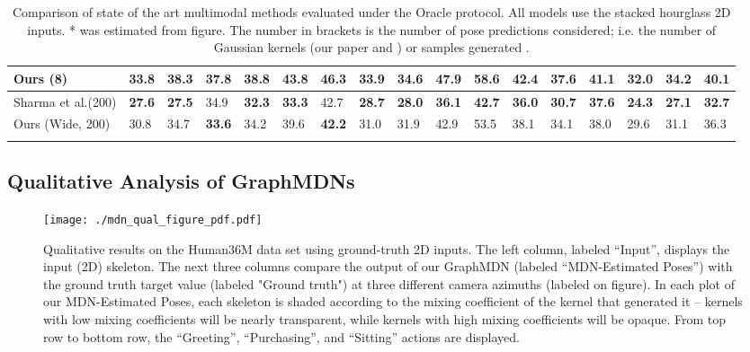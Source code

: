 \begin{table}
\begin{tabular}{lllllllllllllllll}
Ours (8) & 33.8 & 38.3 & 37.8 & 38.8 & 43.8 & 46.3 & 33.9 & 34.6 & 47.9 & 58.6 & 42.4 & 37.6 & 41.1 & 32.0 & 34.2 & 40.1 \\ \hline
Sharma et al.\cite{Sharma_2019_ICCV}(200) & \textbf{27.6} & \textbf{27.5} & 34.9 & \textbf{32.3} & \textbf{33.3} & 42.7 & \textbf{28.7} & \textbf{28.0} & \textbf{36.1} & \textbf{42.7} & \textbf{36.0} & \textbf{30.7} & \textbf{37.6} & \textbf{24.3} & \textbf{27.1} & \textbf{32.7} \\
Ours (Wide, 200) & 30.8 & 34.7 & \textbf{33.6} & 34.2 & 39.6 & \textbf{42.2} & 31.0 & 31.9 & 42.9 & 53.5 & 38.1 & 34.1 & 38.0 & 29.6 & 31.1 & 36.3 \\
 &  &  &  &  &  &  &  &  &  &  &  &  &  &  &  & 
\end{tabular}
\label{tab:oracle}
\caption{Comparison of state of the art multimodal methods evaluated under the Oracle protocol. All models use the stacked hourglass 2D inputs. * was estimated from figure. The number in brackets is the number of pose predictions considered; i.e. the number of Gaussian kernels (our paper and \cite{Li_2019_CVPR}) or samples generated \cite{Sharma_2019_ICCV}.}
\end{table}

\subsection{Qualitative Analysis of GraphMDNs}

\begin{figure*}[h]
  \begin{center}
\texttt{[image: ./mdn\_qual\_figure\_pdf.pdf]}
  \end{center}
  \caption{Qualitative results on the Human36M data set using ground-truth 2D inputs. The left column, labeled ``Input'', displays the input (2D) skeleton. The next three columns compare the output of our GraphMDN (labeled ``MDN-Estimated Poses'') with the ground truth target value (labeled "Ground truth") at three different camera azimuths (labeled on figure). In each plot of our MDN-Estimated Poses, each skeleton is shaded according to the mixing coefficient of the kernel that generated it -- kernels with low mixing coefficients will be nearly transparent, while kernels with high mixing coefficients will be opaque. From top row to bottom row, the ``Greeting'', ``Purchasing'', and ``Sitting'' actions are displayed.}
  \label{fig:occlusion_figure}
\end{figure*}

